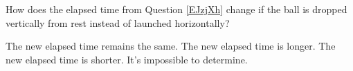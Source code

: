 \documentclass[../main-physics-workbook.tex]{subfiles}
\begin{document}
\begin{questions}
\question
How does the elapsed time from Question \ref{EJzjXh} change if the ball is dropped vertically from rest instead of launched horizontally?

\begin{randomizechoices}[keeplast]
    \correctchoice The new elapsed time remains the same.
    \choice The new elapsed time is longer.
    \choice The new elapsed time is shorter.
    \choice It's impossible to determine.
\end{randomizechoices}



\end{questions}
\end{document}
